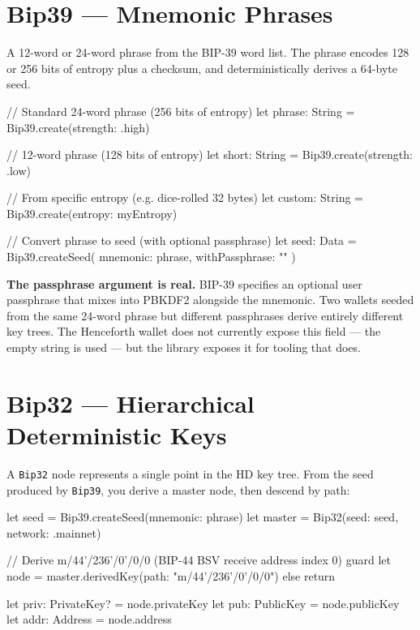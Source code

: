 \documentclass[a4paper, 11pt, openany]{book}
\begin{document}
\section{Bip39 --- Mnemonic Phrases}

A 12-word or 24-word phrase from the BIP-39 word list. The phrase encodes 128 or 256 bits of entropy plus a checksum, and deterministically derives a 64-byte seed.

\begin{forthbox}
// Standard 24-word phrase (256 bits of entropy)
let phrase: String = Bip39.create(strength: .high)

// 12-word phrase (128 bits of entropy)
let short: String = Bip39.create(strength: .low)

// From specific entropy (e.g. dice-rolled 32 bytes)
let custom: String = Bip39.create(entropy: myEntropy)

// Convert phrase to seed (with optional passphrase)
let seed: Data = Bip39.createSeed(
    mnemonic: phrase,
    withPassphrase: ""
)
\end{forthbox}

\begin{notebox}
\textbf{The passphrase argument is real.} BIP-39 specifies an optional user passphrase that mixes into PBKDF2 alongside the mnemonic. Two wallets seeded from the same 24-word phrase but different passphrases derive entirely different key trees. The Henceforth wallet does not currently expose this field --- the empty string is used --- but the library exposes it for tooling that does.
\end{notebox}

\section{Bip32 --- Hierarchical Deterministic Keys}

A \texttt{Bip32} node represents a single point in the HD key tree. From the seed produced by \texttt{Bip39}, you derive a master node, then descend by path:

\begin{forthbox}
let seed = Bip39.createSeed(mnemonic: phrase)
let master = Bip32(seed: seed, network: .mainnet)

// Derive m/44'/236'/0'/0/0 (BIP-44 BSV receive address index 0)
guard let node = master.derivedKey(path: "m/44'/236'/0'/0/0")
else { return }

let priv: PrivateKey? = node.privateKey
let pub: PublicKey   = node.publicKey
let addr: Address    = node.address
\end{forthbox}
\end{document}
